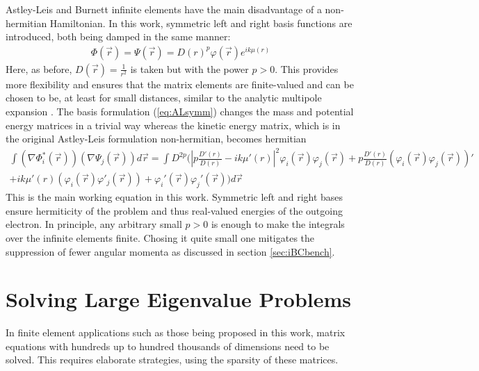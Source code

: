 Astley-Leis and Burnett infinite elements have the main disadvantage of a non-hermitian Hamiltonian.
In this work, symmetric left and right basis functions are introduced, both being damped in the same manner:
\begin{align} \label{eq:ALsymm}
\Phi(\vec{r}) = \Psi(\vec{r}) = D(r)^p\varphi(\vec{r}) e^{ik\mu(r)}
\end{align}
Here, as before, $D(\vec{r})=\frac{1}{r^2}$ is taken but with the power $p>0$.
This provides more flexibility and ensures that the matrix elements are finite-valued and can be chosen to be, at least for small distances, similar to the analytic multipole expansion .
The basis formulation (\ref{eq:ALsymm}) changes the mass and potential energy matrices in a trivial way whereas the kinetic energy matrix, which is in the original Astley-Leis formulation non-hermitian, becomes hermitian
\begin{multline} \label{eq:SymmKinE}
\int \left(\nabla \Phi^*_i(\vec{r})\right) \left(\nabla \Psi_j(\vec{r})\right) d\vec{r}=
\int D^{2p}\Big(
\left|p \frac{D'(r)}{D(r)}- ik\mu'(r)\right|^2\varphi_i(\vec{r})\varphi_j(\vec{r}) 
+p \frac{D'(r)}{D(r)} \left(\varphi_i(\vec{r})\varphi_j(\vec{r})\right)'\\
+ ik\mu'(r) \left(\varphi_i(\vec{r})\varphi'_j(\vec{r})\right)+ \varphi_i'(\vec{r})\varphi_j'(\vec{r})
\Big)d\vec{r}  
\end{multline}
This is the main working equation in this work.
Symmetric left and right bases ensure hermiticity of the problem and thus real-valued energies of the outgoing electron.
In principle, any arbitrary small $p>0$ is enough to make the integrals over the infinite elements finite.
Chosing it quite small one mitigates the suppression of fewer angular momenta as discussed in section \ref{sec:iBCbench}.

\section{Solving Large Eigenvalue Problems}
\label{ch:ghep}
In finite element applications such as those being proposed in this work, matrix equations with hundreds up to hundred thousands of dimensions need to be solved.
This requires elaborate strategies, using the sparsity of these matrices.

